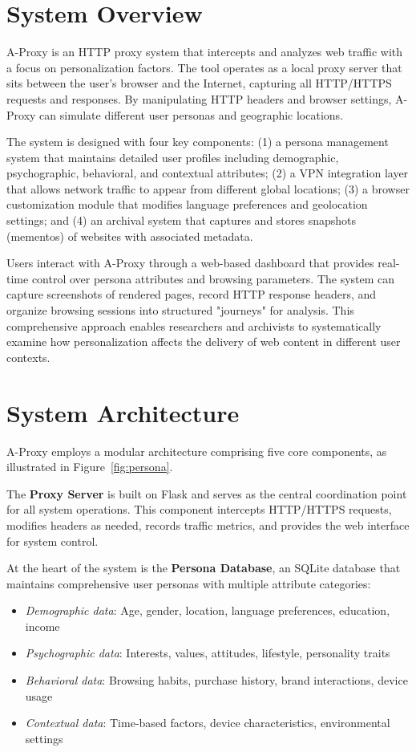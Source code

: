 \documentclass[sigconf]{acmart}
\begin{document}
\section{System Overview}
A-Proxy is an HTTP proxy system that intercepts and analyzes web traffic with a focus on personalization factors. The tool operates as a local proxy server that sits between the user's browser and the Internet, capturing all HTTP/HTTPS requests and responses. By manipulating HTTP headers and browser settings, A-Proxy can simulate different user personas and geographic locations.

The system is designed with four key components: (1) a persona management system that maintains detailed user profiles including demographic, psychographic, behavioral, and contextual attributes; (2) a VPN integration layer that allows network traffic to appear from different global locations; (3) a browser customization module that modifies language preferences and geolocation settings; and (4) an archival system that captures and stores snapshots (mementos) of websites with associated metadata.

Users interact with A-Proxy through a web-based dashboard that provides real-time control over persona attributes and browsing parameters. The system can capture screenshots of rendered pages, record HTTP response headers, and organize browsing sessions into structured "journeys" for analysis. This comprehensive approach enables researchers and archivists to systematically examine how personalization affects the delivery of web content in different user contexts.

\section{System Architecture}
A-Proxy employs a modular architecture comprising five core components, as illustrated in Figure~\ref{fig:persona}.

The \textbf{Proxy Server} is built on Flask and serves as the central coordination point for all system operations. This component intercepts HTTP/HTTPS requests, modifies headers as needed, records traffic metrics, and provides the web interface for system control.

At the heart of the system is the \textbf{Persona Database}, an SQLite database that maintains comprehensive user personas with multiple attribute categories:
\begin{itemize}
    \item \textit{Demographic data}: Age, gender, location, language preferences, education, income
    \item \textit{Psychographic data}: Interests, values, attitudes, lifestyle, personality traits
    \item \textit{Behavioral data}: Browsing habits, purchase history, brand interactions, device usage
    \item \textit{Contextual data}: Time-based factors, device characteristics, environmental settings
\end{itemize}
\end{document}

